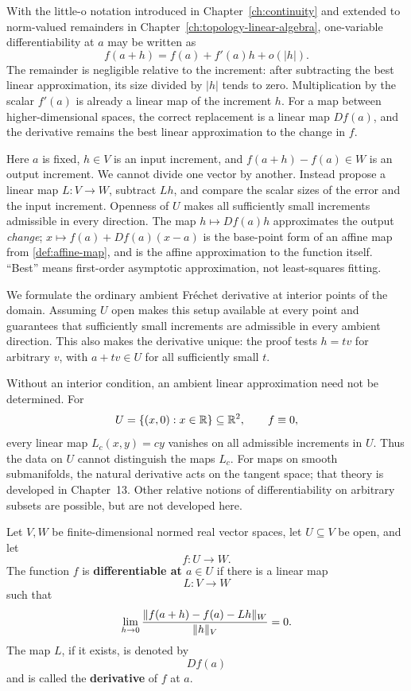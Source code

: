 With the little-o notation introduced in Chapter~\ref{ch:continuity} and
extended to norm-valued remainders in Chapter~\ref{ch:topology-linear-algebra},
one-variable differentiability at \(a\) may be written as
\[
f(a+h)=f(a)+f'(a)h+o(\lvert h\rvert).
\]
The remainder is negligible relative to the increment: after subtracting
the best linear approximation, its size divided by $|h|$ tends to zero.
Multiplication by the scalar \(f'(a)\) is already a linear map of the
increment \(h\).  For a map between higher-dimensional spaces, the correct
replacement is a linear map \(Df(a)\), and the derivative remains the best
linear approximation to the change in \(f\).

Here $a$ is fixed, $h\in V$ is an input increment, and
$f(a+h)-f(a)\in W$ is an output increment. We cannot divide one vector
by another. Instead propose a linear map $L:V\to W$, subtract $Lh$,
and compare the scalar sizes of the error and the input increment.
Openness of $U$ makes all sufficiently small increments admissible in
every direction. The map $h\mapsto Df(a)h$ approximates the output
\emph{change}; $x\mapsto f(a)+Df(a)(x-a)$ is the base-point form of an
affine map from \cref{def:affine-map}, and is the affine approximation
to the function itself. ``Best'' means first-order asymptotic approximation,
not least-squares fitting.

We formulate the ordinary ambient Fr\'echet derivative at interior points of
the domain. Assuming $U$ open makes this setup available at every point and
guarantees that sufficiently small increments are admissible in every ambient
direction. This also makes the derivative unique: the proof tests $h=tv$ for
arbitrary $v$, with $a+tv\in U$ for all sufficiently small $t$.

Without an interior condition, an ambient linear approximation need not be
determined. For
\[
U=\{(x,0):x\in\mathbb{R}\}\subseteq\mathbb{R}^2,
\qquad f\equiv0,
\]
every linear map $L_c(x,y)=cy$ vanishes on all admissible increments in $U$.
Thus the data on $U$ cannot distinguish the maps $L_c$. For maps on smooth
submanifolds, the natural derivative acts on the tangent space; that theory
is developed in Chapter~13. Other relative notions of differentiability on
arbitrary subsets are possible, but are not developed here.

\begin{definition}
Let $V,W$ be finite-dimensional normed real vector spaces, let $U\subseteq V$
be open, and let
\[
f:U\longrightarrow W.
\]
The function $f$ is \textbf{differentiable at $a\in U$} if there is a linear
map
\[
L:V\longrightarrow W
\]
such that
\[
\lim_{h\to0}
\frac{\lVert f(a+h)-f(a)-Lh\rVert_W}{\lVert h\rVert_V}=0.
\]
The map $L$, if it exists, is denoted by
\[
Df(a)
\]
and is called the \textbf{derivative} of $f$ at $a$.
\end{definition}


